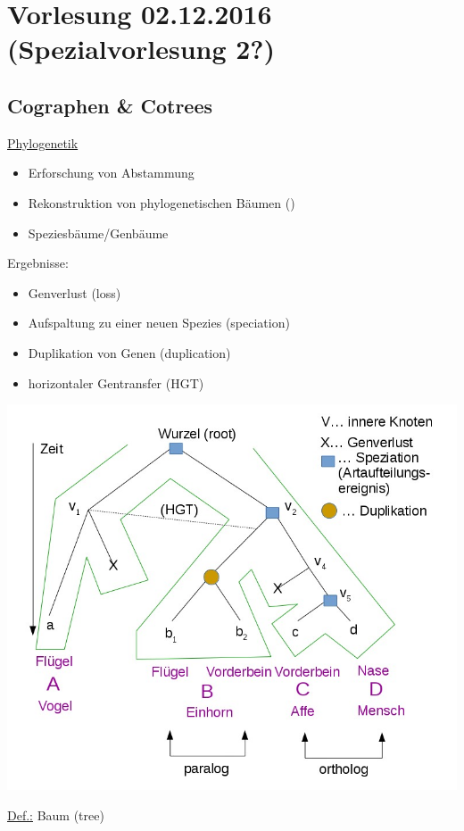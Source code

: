\section{Vorlesung 02.12.2016 (Spezialvorlesung 2?)}

\subsection{Cographen \& Cotrees}
\underline{Phylogenetik}
\begin{itemize}
    \item Erforschung von Abstammung
    \item Rekonstruktion von phylogenetischen Bäumen (\grqq )
    \item Speziesbäume/Genbäume
\end{itemize}    
Ergebnisse:
\begin{itemize}
    \item Genverlust (loss)
    \item Aufspaltung zu einer neuen Spezies (speciation)
    \item Duplikation von Genen (duplication)
    \item horizontaler Gentransfer (HGT)
\end{itemize}
\begin{center}
\includegraphics[scale=0.5]{lectures/161202/pix/01.jpg}
\end{center}
\par\medskip
\underline{Def.:} Baum (tree)
